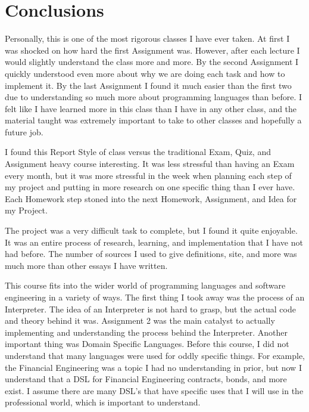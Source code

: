 \documentclass{article}
\theoremstyle{theorem}
\theoremstyle{definition}
\theoremstyle{remark}
\begin{document}
\section{Conclusions}\label{conclusions}

Personally, this is one of the most rigorous classes I have ever taken. At first I was shocked on how hard the first Assignment was. However, after each lecture I would slightly understand the class more and more. By the second Assignment I quickly understood even more about why we are doing each task and how to implement it. By the last Assignment I found it much easier than the first two due to understanding so much more about programming languages than before. I felt like I have learned more in this class than I have in any other class, and the material taught was extremely important to take to other classes and hopefully a future job. 

\noindent\newline I found this Report Style of class versus the traditional Exam, Quiz, and Assignment heavy course interesting. It was less stressful than having an Exam every month, but it was more stressful in the week when planning each step of my project and putting in more research on one specific thing than I ever have. Each Homework step stoned into the next Homework, Assignment, and Idea for my Project. 

\noindent\newline The project was a very difficult task to complete, but I found it quite enjoyable. It was an entire process of research, learning, and implementation that I have not had before. The number of sources I used to give definitions, site, and more was much more than other essays I have written.

\noindent\newline This course fits into the wider world of programming languages and software engineering in a variety of ways. The first thing I took away was the process of an Interpreter. The idea of an Interpreter is not hard to grasp, but the actual code and theory behind it was. Assignment 2 was the main catalyst to actually implementing and understanding the process behind the Interpreter. Another important thing was Domain Specific Languages. Before this course, I did not understand that many languages were used for oddly specific things. For example, the Financial Engineering was a topic I had no understanding in prior, but now I understand that a DSL for Financial Engineering contracts, bonds, and more exist. I assume there are many DSL's that have specific uses that I will use in the professional world, which is important to understand. 
\end{document}
